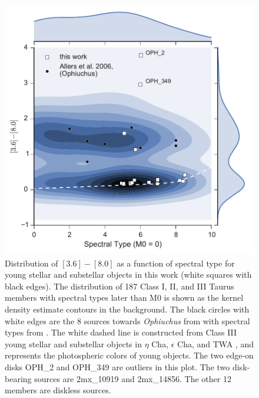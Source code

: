 \begin{figure}[ht!]
  \caption[Mid-infrared slope as a function of spectral type]{Distribution of $[3.6]-[8.0]$ as a function of spectral type for young stellar and substellar objects in this work (white squares with black edges).  The distribution of 187 Class I, II, and III Taurus members with spectral types later than M0 \citep{2010ApJS..186..111L} is shown as the kernel density estimate contours in the background.  The black circles with white edges are the 8 sources towards \emph{Ophiuchus} from \citet{allers06} with spectral types from \citet{2011ASPC..448..633G}.  The white dashed line is constructed from Class III young stellar and substellar objects in $\eta$ Cha, $\epsilon$ Cha, and TWA \citep{2010ApJS..186..111L}, and represents the photospheric colors of young objects.  The two edge-on disks OPH\_2 and OPH\_349 are outliers in this plot.  The two disk-bearing sources are 2mx\_10919 and 2mx\_14856.  The other 12 members are diskless sources.  \label{fig_I1_I4_density} }
\centering
\includegraphics[scale=0.6]{chIMACS/figures/I1_I4_density.pdf}
\end{figure}

